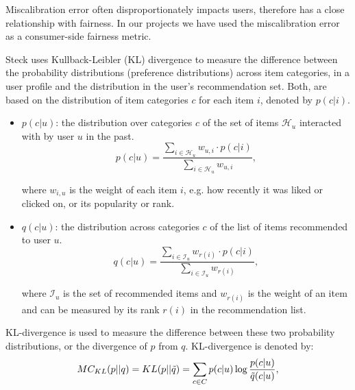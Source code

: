         Miscalibration error often disproportionately impacts users, therefore has a close relationship with fairness. In our projects we have used the miscalibration error as a consumer-side fairness metric.
        
        
        Steck uses Kullback-Leibler (KL) divergence to measure the difference between the probability distributions (preference distributions) across item categories, in a user profile and the distribution in the user's recommendation set. Both, are based on the distribution of item categories $c$ for each item $i$, denoted by $p(c|i)$.
    
        \begin{itemize}
            \item $p(c|u)$: the distribution over categories $c$ of the set of items $\mathcal{H}_u$ interacted with by user $u$ in the past.
            \begin{equation}\label{input_preference}
                p(c|u) = \frac{\sum_{i \in \mathcal{H}_u} w_{u, i} \cdot p(c|i)}{\sum_{i \in \mathcal{H}_u} w_{u, i}},
            \end{equation}
        
            where $w_{i,u}$ is the weight of each item $i$, e.g. how recently it was liked or clicked on, or its popularity or rank.
            
            \item $q(c|u)$: the distribution across categories $c$ of the list of items recommended to user $u$.
            \begin{equation}
                q(c|u) = \frac{\sum_{i \in \mathcal{I}_u} w_{r(i)} \cdot p(c|i)}{\sum_{i \in \mathcal{I}_u} w_{r(i)}},
            \end{equation}
            
            where $\mathcal{I}_u$ is the set of recommended items and $w_{r(i)}$ is the weight of an item and can be measured by its rank $r(i)$ in the recommendation list.
        \end{itemize}
    
        KL-divergence \cite{kullback1997information} is used to measure the difference between these two probability distributions, or the divergence of $p$ from $q$. KL-divergence is denoted by:
        \begin{equation} \label{kl}
        MC_{KL}(p||q) = KL(p||\Tilde{q})= \sum_{c \in C}{p(c|u)\log\frac{p(c|u)}{\Tilde{q}(c|u)}},
        \end{equation}
        
